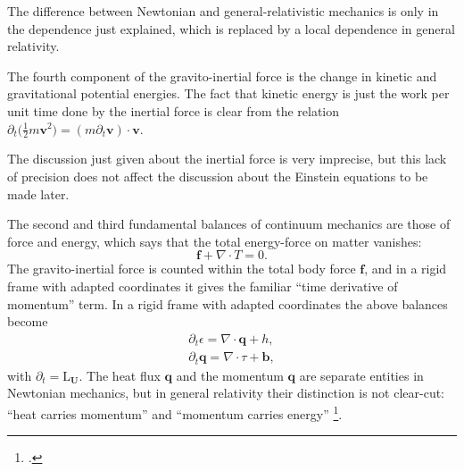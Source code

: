 \documentclass[\ifafour a4paper,12pt,\else a5paper,10pt,\fi%
onecolumn,oneside,article,%
british%
]{memoir}
\theoremstyle{remark}
\theoremstyle{innote}
\newcommand*{\citep}{\footcites}%
\newcommand*{\de}{\partialup}%
\newcommand*{\di}{\mathrm{d}}%
\renewcommand*{\|}{\nonscript\,\vert\nonscript\;\mathopen{}}
\newcommand*{\Li}{\mathrm{L}}
\newcommand*{\yjj}{p}
\newcommand*{\yj}{\bm{\yjj}}
\newcommand*{\yQ}{h}
\newcommand*{\yqq}{q}
\newcommand*{\yq}{\bm{\yqq}}
\newcommand*{\yTT}{\tau}
\newcommand*{\yT}{\bm{\yTT}}
\newcommand*{\yTTf}{T}
\newcommand*{\ybb}{f}
\newcommand*{\yb}{\bm{\ybb}}
\newcommand*{\ybbf}{b}
\newcommand*{\ybf}{\bm{\ybbf}}
\newcommand*{\yvvt}{v}
\newcommand*{\yvt}{\bm{\yvvt}}
\newcommand*{\yFF}{U}
\newcommand*{\yF}{\bm{\yFF}}
\newcommand*{\yff}{f}
\newcommand*{\yf}{\bm{\yff}}
\newcommand*{\ypp}{q}
\newcommand*{\yp}{\bm{\ypp}}
\newcommand*{\yeen}{e}
\renewcommand*{\yen}{\bm{\yeen}}
\newcommand*{\ye}{\epsilon}
\newcommand*{\ynab}{\nabla}
\begin{document}
The difference between Newtonian and general-relativistic mechanics is only
in the dependence just explained, which is replaced by a local dependence in
general relativity.

The fourth component of the gravito-inertial force is the change in kinetic
and gravitational potential energies. The fact that kinetic energy is just
the work per unit time done by the inertial force is clear from the
relation $\de_t\bigl(\frac{1}{2}m\yvt^2\bigr) = (m\de_t\yvt) \cdot \yvt$.

The discussion just given about the inertial force is very imprecise, but
this lack of precision does not affect the discussion about the Einstein
equations to be made later.

\bigskip

The second and third fundamental balances of continuum mechanics are those
of force and energy, which says that the total energy-force on matter vanishes:
\begin{equation}
  \label{eq:force_balance}
  \yb + \ynab\cdot\yTTf = 0.
\end{equation}
The gravito-inertial force is counted within the total body force $\yb$,
and in a rigid frame with adapted coordinates it gives the familiar
\enquote{time derivative of momentum} term. In a rigid frame with adapted
coordinates the above balances become
\begin{gather}
  \label{eq:energy_balance_newtonian}
  \de_t \ye = \ynab\cdot\yq + \yQ,
  \\
  \de_t\yp = \ynab\cdot\yTT + \ybf,
\end{gather}
with $\de_t = \Li_{\yF}$. The heat flux $\yq$ and the momentum $\yq$ are
separate entities in Newtonian mechanics, but in general relativity their
distinction is not clear-cut: \enquote{heat carries momentum} and
\enquote{momentum carries energy} \citep{eckart1940c}.




\end{document}
